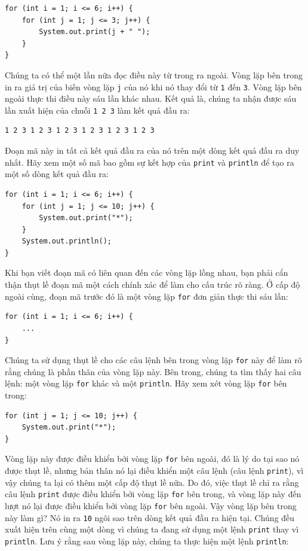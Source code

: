 \begin{verbatim}
for (int i = 1; i <= 6; i++) {
    for (int j = 1; j <= 3; j++) {
        System.out.print(j + " ");
    }
}
\end{verbatim}

Chúng ta có thể một lần nữa đọc điều này từ trong ra ngoài. Vòng lặp bên
trong in ra giá trị của biến vòng lặp \texttt{j} của nó khi nó thay đổi
từ \texttt{1} đến \texttt{3}. Vòng lặp bên ngoài thực thi điều này sáu
lần khác nhau. Kết quả là, chúng ta nhận được sáu lần xuất hiện của
chuỗi \texttt{1\ 2\ 3} làm kết quả đầu ra:

\begin{verbatim}
1 2 3 1 2 3 1 2 3 1 2 3 1 2 3 1 2 3
\end{verbatim}

Đoạn mã này in tất cả kết quả đầu ra của nó trên một dòng kết quả đầu ra
duy nhất. Hãy xem một số mã bao gồm sự kết hợp của \texttt{print} và
\texttt{println} để tạo ra một số dòng kết quả đầu ra:

\begin{verbatim}
for (int i = 1; i <= 6; i++) {
    for (int j = 1; j <= 10; j++) {
        System.out.print("*");
    }
    System.out.println();
}
\end{verbatim}

Khi bạn viết đoạn mã có liên quan đến các vòng lặp lồng nhau, bạn phải
cẩn thận thụt lề đoạn mã một cách chính xác để làm cho cấu trúc rõ ràng.
Ở cấp độ ngoài cùng, đoạn mã trước đó là một vòng lặp \texttt{for} đơn
giản thực thi sáu lần:

\begin{verbatim}
for (int i = 1; i <= 6; i++) {
    ...
}
\end{verbatim}

Chúng ta sử dụng thụt lề cho các câu lệnh bên trong vòng lặp
\texttt{for} này để làm rõ rằng chúng là phần thân của vòng lặp này. Bên
trong, chúng ta tìm thấy hai câu lệnh: một vòng lặp \texttt{for} khác và
một \texttt{println}. Hãy xem xét vòng lặp \texttt{for} bên trong:

\begin{verbatim}
for (int j = 1; j <= 10; j++) {
    System.out.print("*");
}
\end{verbatim}

Vòng lặp này được điều khiển bởi vòng lặp \texttt{for} bên ngoài, đó là
lý do tại sao nó được thụt lề, nhưng bản thân nó lại điều khiển một câu
lệnh (câu lệnh \texttt{print}), vì vậy chúng ta lại có thêm một cấp độ
thụt lề nữa. Do đó, việc thụt lề chỉ ra rằng câu lệnh \texttt{print}
được điều khiển bởi vòng lặp \texttt{for} bên trong, và vòng lặp này đến
lượt nó lại được điều khiển bởi vòng lặp \texttt{for} bên ngoài. Vậy
vòng lặp bên trong này làm gì? Nó in ra \texttt{10} ngôi sao trên dòng
kết quả đầu ra hiện tại. Chúng đều xuất hiện trên cùng một dòng vì chúng
ta đang sử dụng một lệnh \texttt{print} thay vì \texttt{println}. Lưu ý
rằng sau vòng lặp này, chúng ta thực hiện một lệnh \texttt{println}:

